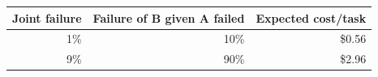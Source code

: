 \begin{tabular}{rrr}
\toprule
Joint failure & Failure of B given A failed & Expected cost/task \\
\midrule
1\% & 10\% & \$0.56 \\
9\% & 90\% & \$2.96 \\
\bottomrule
\end{tabular}
